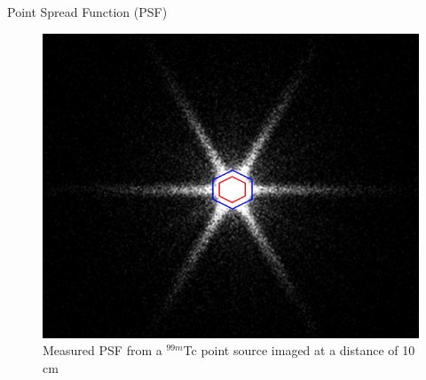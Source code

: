 \begin{frame}[c]{Point Spread Function (PSF)}
    \begin{figure}[]
        \centering
        \includegraphics[height=0.8\textheight]{images/spiders.png}
        \caption{\large Measured PSF from a ${}^{99m}$Tc point source imaged at a distance
            of 10 cm~\cite{sanders18}}
    \end{figure}
\end{frame}





